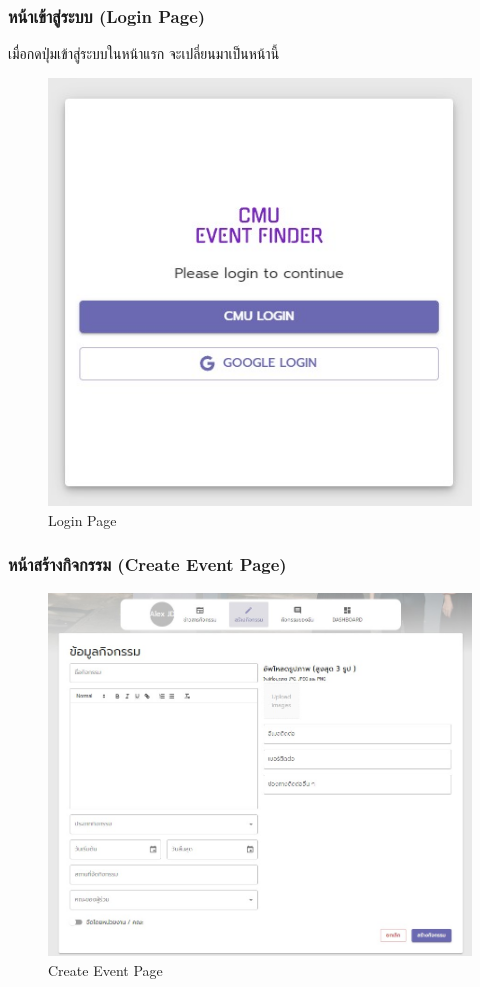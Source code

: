 \subsubsection{หน้าเข้าสู่ระบบ (Login Page)}
เมื่อกดปุ่มเข้าสู่ระบบในหน้าแรก จะเปลี่ยนมาเป็นหน้านี้
\begin{figure}[H]
\begin{center}
\includegraphics[scale=0.6]{public/login-page.jpg}
\end{center}
\caption[Poem]{Login Page}
\label{fig:login-page}
\end{figure}

\subsubsection{หน้าสร้างกิจกรรม (Create Event Page)}
\begin{figure}[H]
\begin{center}
\includegraphics[scale=0.6]{public/create-act.jpg}
\end{center}
\caption[Poem]{Create Event Page}
\label{fig:create-page}
\end{figure}
\clearpage

